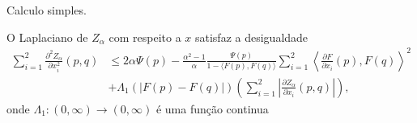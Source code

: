 \begin{demonstracao}
	Calculo simples.
\end{demonstracao}

\begin{lema}
	O Laplaciano de $Z_{\alpha}$ com respeito a $x$ satisfaz a desigualdade
	\begin{equation*}
		\begin{split}
		\sum_{i=1}^{2} \frac{\partial^2 Z_{\alpha}}{\partial x_i^2} (p,q) & \leq 2 \alpha \Psi(p) - \frac{\alpha^2 - 1}{\alpha} \frac{\Psi(p)}{1 - \langle F(p), F(q) \rangle} \sum_{i=1}^{2} \left\langle \frac{\partial F}{\partial x_i} (p), F(q) \right\rangle^2\\
		& + \Lambda_1 (| F(p) - F(q) |) \left( \sum_{i=1}^{2} \left| \frac{\partial Z_{\alpha}}{\partial x_i} (p,q) \right| \right),
		\end{split}		
	\end{equation*}
	onde $\Lambda_1: (0,\infty) \rightarrow (0,\infty)$ é uma função continua
\end{lema}

